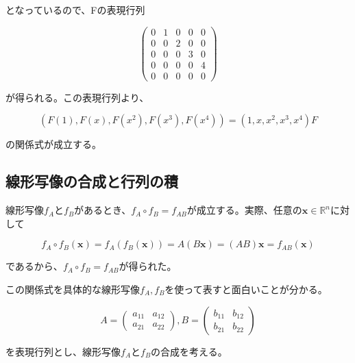 \documentclass[dvipdfmx,autodetect-engine]{jsarticle}
\newcommand{\vecSpace}[1]{\mathbb{R}^{#1}}
\begin{document}
となっているので、Fの表現行列

$$
\begin{pmatrix}
0 & 1 & 0 & 0 & 0 \\
0 & 0 & 2 & 0 & 0 \\
0 & 0 & 0 & 3 & 0 \\
0 & 0 & 0 & 0 & 4 \\
0 & 0 & 0 & 0 & 0
\end{pmatrix}
$$

が得られる。この表現行列より、

$$
(F(1), F(x), F(x^2), F(x^3), F(x^4)) = (1, x, x^2, x^3, x^4)F
$$

の関係式が成立する。


\subsection{線形写像の合成と行列の積}

線形写像$f_A$と$f_B$があるとき、$f_A \circ f_B = f_{AB}$が成立する。実際、任意の$\bm{x} \in \vecSpace{n}$に対して

$$
f_A \circ f_B(\bm{x}) = f_A(f_B(\bm{x})) = A(B\bm{x}) = (AB)\bm{x} = f_{AB}(\bm{x})
$$

であるから、$f_A \circ f_B = f_{AB}$が得られた。

この関係式を具体的な線形写像$f_A, f_B$を使って表すと面白いことが分かる。

$$
A = \begin{pmatrix}
a_{11} & a_{12} \\
a_{21} & a_{22}
\end{pmatrix}, 
B = \begin{pmatrix}
b_{11} & b_{12} \\
b_{21} & b_{22}
\end{pmatrix}
$$

を表現行列とし、線形写像$f_A$と$f_B$の合成を考える。
\end{document}
